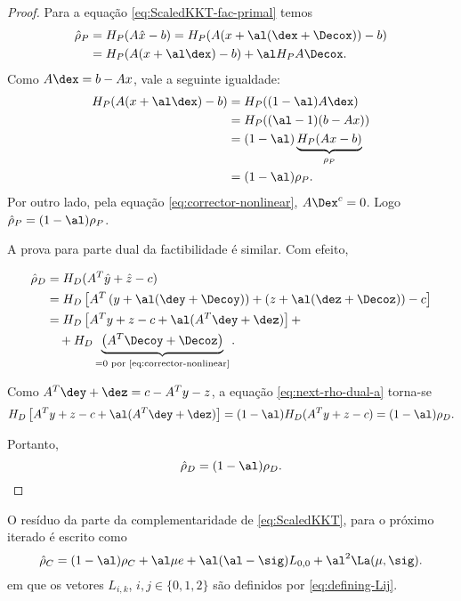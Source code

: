 \begin{proof}
Para a equação \eqref{eq:ScaledKKT-fac-primal} temos
\[
\begin{aligned}
\hat{\rho}_P & = H_P(A\hat{x} -b) = H_P(A(x + \al(\dex +
\Decox )) -b) \\ 
			& = H_P(A(x +  \al\dex) - b) +
 \al H_PA\Decox.
\end{aligned}
\]
Como $A\dex = b- Ax$, vale a seguinte igualdade:
\[
\begin{aligned}
H_P(A(x +  \al\dex) - b) & = H_P((1-\al)A\dex) \\
							& = 	 H_P((\al -1)(b-Ax)) \\
							& =  (1 - \al)\underbrace{H_P(Ax - b)}_{\rho_P} 	\\
							& = (1 - \al)\rho_P.					
\end{aligned}
\]
Por outro lado, pela equação \eqref{eq:corrector-nonlinear}, $A\Dex^c= 0$. Logo
$\hat{\rho}_P = (1-\al)\rho_P$.

A prova para parte dual da factibilidade é similar. Com efeito,

\begin{align}
\hat{\rho}_D & = H_D(A^T\hat{y} + \hat{z} -c)   \notag \\
			& = H_D\left[ A^T\left(y + \al(\dey + \Decoy)\right) + \left(z + \al(\dez + \Decoz )\right)
			-c\right] \notag\\
 			& = H_D\left[A^Ty  + z -c +  \al(A^T\dey + \dez)\right] +
 			\label{eq:next-rho-dual-a}\\
 			& \quad + H_D\underbrace{\left(A^T\Decoy   + \Decoz\right)}_{=0 \text{ por
 			\eqref{eq:corrector-nonlinear}}}. \notag 
\end{align}

% 
Como $A^T\dey + \dez = c - A^Ty - z$, a equação \eqref{eq:next-rho-dual-a}
torna-se
\[
H_D\left[A^Ty  + z -c +  \al(A^T\dey + \dez)\right]  = (1-\al)H_D 
(A^Ty + z - c)  = (1-\al)\rho_D.
\]

Portanto, 
\[
\hat{\rho}_D = (1-\al)\rho_D .
\]
\end{proof}
 
 
\begin{lema}\label{lemma:nonlinear-residual}
O resíduo da parte da complementaridade de  \eqref{eq:ScaledKKT}, para o próximo iterado é
escrito como
\begin{equation}
\label{eq:next-residual-complementar}
\hat{\rho}_C = (1-\al)\rho_C + \al\mu e+ \al(\al-\sig)L_{0,0} +
\al^2\La(\mu,\sig).
\end{equation}
em que os vetores $L_{i,k}$, $i,j \in \{0,1,2\}$ são definidos por
\eqref{eq:defining-Lij}.
\end{lema}

